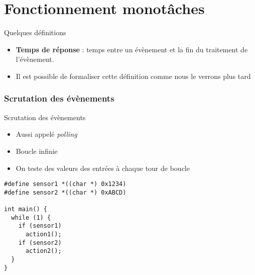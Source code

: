 %
%
%

\part{Fonctionnement monotâches}

\begin{frame}
  \partpage
\end{frame}

\begin{frame}
  \tableofcontents
\end{frame}

\begin{frame}{Quelques définitions}
  \begin{itemize}
  \item \textbf{Temps de réponse} : temps entre un évènement et la fin
    du traitement de l'évènement.
  \item Il est  possible de formaliser cette définition  comme nous le
    verrons plus tard
  \end{itemize}
\end{frame}

\section{Scrutation des évènements}
\begin{frame}[fragile]{Scrutation des évènements}
  \begin{itemize}
  \item Aussi appelé \emph{polling}
  \item Boucle infinie
  \item On teste des valeurs des entrées à chaque tour de boucle
  \end{itemize}
  \begin{lstlisting}
#define sensor1 *((char *) 0x1234)
#define sensor2 *((char *) 0xABCD)

int main() {
  while (1) {
    if (sensor1)
      action1();
    if (sensor2)
      action2();
  }
}
  \end{lstlisting}
\end{frame}

